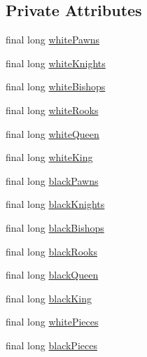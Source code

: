 \subsection*{Private Attributes}
\begin{DoxyCompactItemize}
\item 
final long \mbox{\hyperlink{classcom_1_1chess_1_1engine_1_1bitboards_1_1_bit_board_v2_ad5983101a0b80c096b547a2f445d09f5}{white\+Pawns}}
\item 
final long \mbox{\hyperlink{classcom_1_1chess_1_1engine_1_1bitboards_1_1_bit_board_v2_a449c000d17727ff72fcbdc2083ff476d}{white\+Knights}}
\item 
final long \mbox{\hyperlink{classcom_1_1chess_1_1engine_1_1bitboards_1_1_bit_board_v2_ae9ca33072abb78ae0262c1319e73ce91}{white\+Bishops}}
\item 
final long \mbox{\hyperlink{classcom_1_1chess_1_1engine_1_1bitboards_1_1_bit_board_v2_a0b16c01a2b8087b426a60f029fa21303}{white\+Rooks}}
\item 
final long \mbox{\hyperlink{classcom_1_1chess_1_1engine_1_1bitboards_1_1_bit_board_v2_ac6681692d0198005c4c68066409abd18}{white\+Queen}}
\item 
final long \mbox{\hyperlink{classcom_1_1chess_1_1engine_1_1bitboards_1_1_bit_board_v2_afea0c72c3b1a59f370973b6e050ad363}{white\+King}}
\item 
final long \mbox{\hyperlink{classcom_1_1chess_1_1engine_1_1bitboards_1_1_bit_board_v2_ac8178e9ab0107d63ce3079e57720a21b}{black\+Pawns}}
\item 
final long \mbox{\hyperlink{classcom_1_1chess_1_1engine_1_1bitboards_1_1_bit_board_v2_af194bdea9665afd9420b1b8a7269e78e}{black\+Knights}}
\item 
final long \mbox{\hyperlink{classcom_1_1chess_1_1engine_1_1bitboards_1_1_bit_board_v2_a0e6cbbf04869cfb263d031d62dd42435}{black\+Bishops}}
\item 
final long \mbox{\hyperlink{classcom_1_1chess_1_1engine_1_1bitboards_1_1_bit_board_v2_ad2015a0c94fa85d4ae0921b246287bf1}{black\+Rooks}}
\item 
final long \mbox{\hyperlink{classcom_1_1chess_1_1engine_1_1bitboards_1_1_bit_board_v2_a27d9db3ea14076f4da6a5264f45db298}{black\+Queen}}
\item 
final long \mbox{\hyperlink{classcom_1_1chess_1_1engine_1_1bitboards_1_1_bit_board_v2_ae53e4cf3123c6ac4092fefe6b2f25619}{black\+King}}
\item 
final long \mbox{\hyperlink{classcom_1_1chess_1_1engine_1_1bitboards_1_1_bit_board_v2_a41ba8a8338361193be64c08822df3d78}{white\+Pieces}}
\item 
final long \mbox{\hyperlink{classcom_1_1chess_1_1engine_1_1bitboards_1_1_bit_board_v2_a93fbec7a240d9330289d2749f59cb320}{black\+Pieces}}
\end{DoxyCompactItemize}
